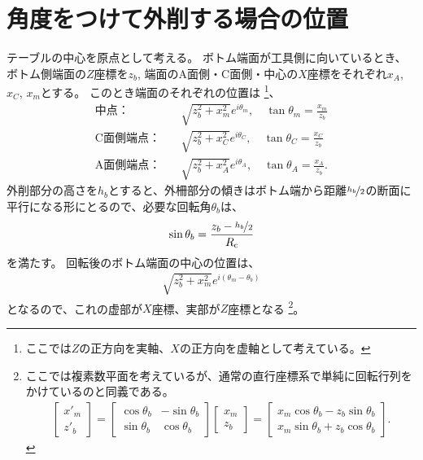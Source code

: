 \section{角度をつけて外削する場合の位置}
テーブルの中心を原点として考える。
ボトム端面が工具側に向いているとき、ボトム側端面の$Z$座標を$z_b$, 端面のA面側・C面側・中心の$X$座標をそれぞれ$x_A$, $x_C$, $x_m$とする。
このとき端面のそれぞれの位置は
\footnote{ここでは$Z$の正方向を実軸、$X$の正方向を虚軸として考えている。}、
\begin{subequations}
\begin{align*}
  \text{中点：}&\quad \sqrt{z_b^2+x_m^2}e^{i\theta_m}, \quad \tan\theta_m = \frac{x_m}{z_b}\\
  \text{C面側端点：}&\quad \sqrt{z_b^2+x_C^2}e^{i\theta_C}, \quad \tan\theta_C = \frac{x_C}{z_b}\\
  \text{A面側端点：}&\quad \sqrt{z_b^2+x_A^2}e^{i\theta_A}, \quad \tan\theta_A = \frac{x_A}{z_b}.
\end{align*}
\end{subequations}
外削部分の高さを$h_b$とすると、外柵部分の傾きはボトム端から距離$\nicefrac{h_b}2$の断面に平行になる形にとるので、必要な回転角$\theta_b$は、
\begin{align*}
  \sin\theta_b = \frac{z_b-\nicefrac{h_b}2}{R_\text c}
\end{align*}
を満たす。
回転後のボトム端面の中心の位置は、
\begin{align*}
  \sqrt{z_b^2+x_m^2}e^{i(\theta_m-\theta_b)}
\end{align*}
となるので、これの虚部が$X$座標、実部が$Z$座標となる
\footnote{ここでは複素数平面を考えているが、通常の直行座標系で単純に回転行列をかけているのと同義である。
\begin{align*}
  \left[
    \begin{array}{c}
      x'_m\\
      z'_b
    \end{array}
  \right]
  = \left[
    \begin{array}{cc}
      \cos\theta_b & -\sin\theta_b\\
      \sin\theta_b & \cos\theta_b
    \end{array}
  \right]\!\!
  \left[
    \begin{array}{c}
      x_m\\
      z_b
    \end{array}
  \right]
  = \left[
    \begin{array}{c}
      x_m\cos\theta_b-z_b\sin\theta_b\\
      x_m\sin\theta_b+z_b\cos\theta_b
    \end{array}
  \right].
\end{align*}}。
